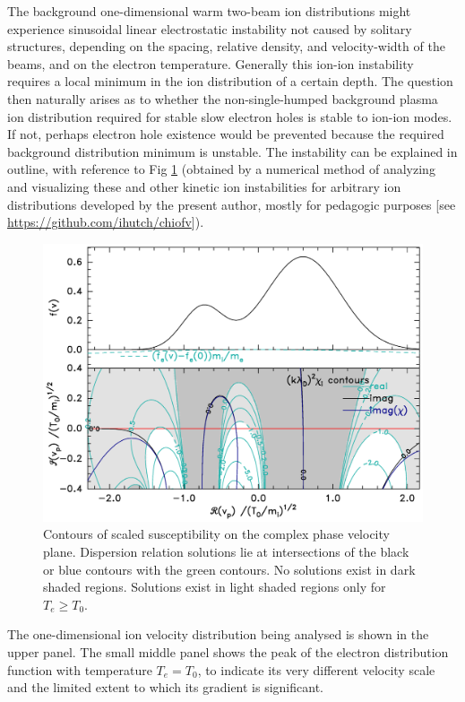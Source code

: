 \documentclass[12pt]{article}
\begin{document}
The background one-dimensional warm two-beam ion distributions might
experience sinusoidal linear electrostatic instability not caused by
solitary structures, depending on the spacing, relative density, and
velocity-width of the beams, and on the electron
temperature\cite{Stringer1964,Fried1966}. Generally this ion-ion
instability requires a local minimum in the ion distribution of a
certain depth. The question then naturally arises as to whether the
non-single-humped background plasma ion distribution required for
stable slow electron holes is stable to ion-ion modes. If not, perhaps
electron hole existence would be prevented because the required
background distribution minimum is unstable.  The instability can
be explained in outline, with reference to Fig \ref{fig:ionstability}
(obtained by a numerical method of analyzing and visualizing these and
other kinetic ion instabilities for arbitrary ion distributions
developed by the present author, mostly for pedagogic purposes [see
\url{https://github.com/ihutch/chiofv}]).
\begin{figure}[htp]
  \centering
  \includegraphics[width=.7\hsize]{ionstabplot}
  \caption{Contours of scaled susceptibility on the complex phase
    velocity plane. Dispersion relation solutions lie at
    intersections of the black or blue contours with the green
    contours. No solutions exist in dark shaded regions. Solutions
    exist in light shaded regions only for $T_e\ge T_0$.}
  \label{fig:ionstability}
\end{figure}
The one-dimensional ion velocity distribution being analysed is shown
in the upper panel. The small middle panel shows the peak of the
electron distribution function with temperature $T_e=T_0$, to indicate
its very different velocity scale and the limited extent to which its gradient
is significant. 
\end{document}
